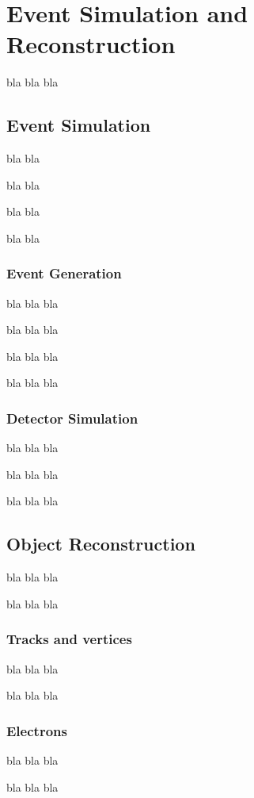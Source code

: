 \chapter{Event Simulation and Reconstruction}

	bla bla bla 

	\section{Event Simulation}

		bla bla

		bla bla

		bla bla

		bla bla

		\subsection{Event Generation}

			bla bla bla 

			bla bla bla 

			bla bla bla 

			bla bla bla 

		\subsection{Detector Simulation}

			bla bla bla 

			bla bla bla 

			bla bla bla 


	\section{Object Reconstruction}

		bla bla bla 

		bla bla bla 


		\subsection{Tracks and vertices}

			bla bla bla 

			bla bla bla 


		\subsection{Electrons}

			bla bla bla 

			bla bla bla 



